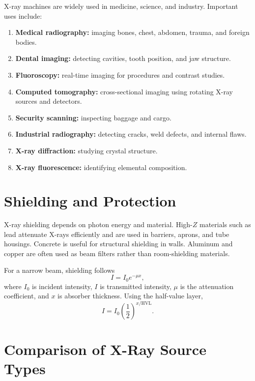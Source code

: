 \documentclass[12pt]{article}
\begin{document}
X-ray machines are widely used in medicine, science, and industry. Important uses include:
\begin{enumerate}[label=\arabic*.]
    \item \textbf{Medical radiography:} imaging bones, chest, abdomen, trauma, and foreign bodies.
    \item \textbf{Dental imaging:} detecting cavities, tooth position, and jaw structure.
    \item \textbf{Fluoroscopy:} real-time imaging for procedures and contrast studies.
    \item \textbf{Computed tomography:} cross-sectional imaging using rotating X-ray sources and detectors.
    \item \textbf{Security scanning:} inspecting baggage and cargo.
    \item \textbf{Industrial radiography:} detecting cracks, weld defects, and internal flaws.
    \item \textbf{X-ray diffraction:} studying crystal structure.
    \item \textbf{X-ray fluorescence:} identifying elemental composition.
\end{enumerate}

\section{Shielding and Protection}

X-ray shielding depends on photon energy and material. High-$Z$ materials such as lead attenuate X-rays efficiently and are used in barriers, aprons, and tube housings. Concrete is useful for structural shielding in walls. Aluminum and copper are often used as beam filters rather than room-shielding materials.

For a narrow beam, shielding follows
\begin{equation}
    I = I_0 e^{-\mu x},
\end{equation}
where $I_0$ is incident intensity, $I$ is transmitted intensity, $\mu$ is the attenuation coefficient, and $x$ is absorber thickness. Using the half-value layer,
\begin{equation}
    I = I_0\left(\frac{1}{2}\right)^{x/\mathrm{HVL}}.
\end{equation}

\section{Comparison of X-Ray Source Types}
\end{document}
